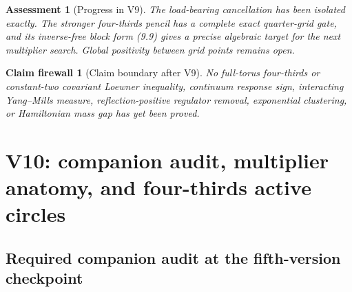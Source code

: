 \documentclass[11pt,oneside]{article}
\newtheorem{assessment}[theorem]{Assessment}
\newtheorem{firewall}[theorem]{Claim firewall}
\theoremstyle{definition}
\theoremstyle{remark}
\begin{document}
\begin{assessment}[Progress in V9]
\label{ass:newv9-progress}
The load-bearing cancellation has been isolated exactly.  The
stronger four-thirds pencil has a complete exact quarter-grid gate,
and its inverse-free block form (9.9) gives a precise algebraic target
for the next multiplier search.  Global positivity between grid
points remains open.
\end{assessment}

\begin{firewall}[Claim boundary after V9]
\label{fire:newv9-final}
No full-torus four-thirds or constant-two covariant Loewner
inequality, continuum response sign, interacting Yang--Mills
measure, reflection-positive regulator removal, exponential
clustering, or Hamiltonian mass gap has yet been proved.
\end{firewall}

\section{V10: companion audit, multiplier anatomy, and four-thirds active circles}
\label{sec:newv10-audit-circles}

\subsection{Required companion audit at the fifth-version checkpoint}
\end{document}
